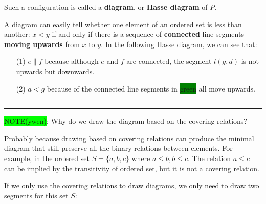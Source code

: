 \documentclass[12pt, letterpaper, oneside]{book}
\begin{document}
Such a configuration is called a \textbf{diagram}, or \textbf{Hasse diagram} of $P$.

A diagram can easily tell whether one element of an ordered set is less than another: $x < y$ if and only if there is a
sequence of \textbf{connected} line segments \textbf{moving upwards} from $x$ to $y$. In the following Hasse diagram, we
can see that:
\begin{enumerate}
  \item[(1)] $e \parallel f$ because although $e$ and $f$ are connected, the segment $l(g, d)$ is not upwards but
        downwards.
  \item[(2)] $a < g$ because of the connected line segments in \colorbox{green}{green} all move upwards.
\end{enumerate}


\noindent\rule[-9pt]{1cm}{10pt}\rule{10cm}{0.4pt}

\colorbox{lime}{NOTE(ywen)}: Why do we draw the diagram based on the covering relations?

Probably because drawing based on covering relations can produce the minimal diagram that still preserve all the binary
relations between elements. For example, in the ordered set $S = \{a, b, c\}$ where $a \leqslant b, b \leqslant c$. The
relation $a \leqslant c$ can be implied by the transitivity of ordered set, but it is not a covering relation.

If we only use the covering relations to draw diagrams, we only need to draw two segments for this set $S$:

\end{document}
